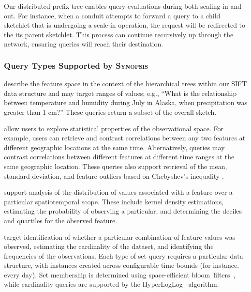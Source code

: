 Our distributed prefix tree enables query evaluations during both scaling in and out. For instance, when a conduit attempts to forward a query to a child sketchlet that is undergoing a scale-in operation, the request will be redirected to the its parent sketchlet. This process can continue recursively up through the network, ensuring queries will reach their destination.

\subsubsection{Query Types Supported by \textsc{Synopsis}}
\begin{description}[leftmargin=*]
    \item[Relational Queries] describe the feature space in the context of the hierarchical trees within our SIFT data structure and may target ranges of values; e.g., ``What is the relationship between temperature and humidity during July in Alaska, when precipitation was greater than 1 cm?'' These queries return a subset of the overall sketch.

    \item[Statistical Queries] allow users to explore statistical properties of the observational space. For example, users can retrieve and contrast correlations between any two features at different geographic locations at the same time. Alternatively, queries may contrast correlations between different features at different time ranges at the same geographic location. These queries also support retrieval of the mean, standard deviation, and feature outliers based on Chebyshev's inequality \cite{knuth1968art}.

    \item[Density Queries] support analysis of the distribution of values associated with a feature over a particular spatiotemporal scope. These include kernel density estimations, estimating the probability of observing a particular, and determining the deciles and quartiles for the observed feature.%

    \item[Set Queries] target identification of whether a particular combination of feature values was observed, estimating the cardinality of the dataset, and identifying the frequencies of the observations. Each type of set query requires a particular data structure, with instances created across configurable time bounds (for instance, every day). Set membership is determined using space-efficient bloom~filters~\cite{bloom1970space}, while cardinality queries are supported by the HyperLogLog~\cite{flajolet2007hyperloglog} algorithm.


\end{description}
